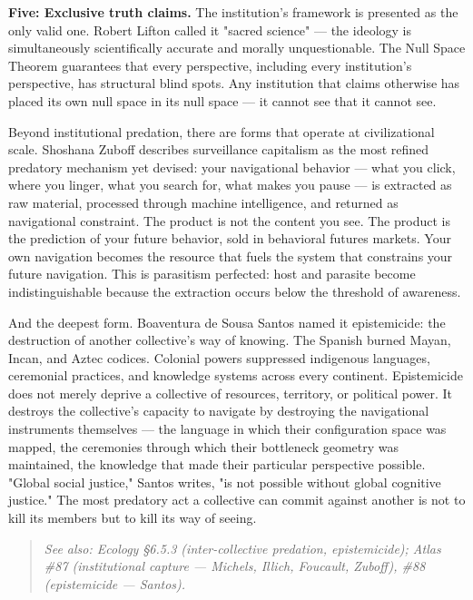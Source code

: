 \textbf{Five: Exclusive truth claims.} The institution's framework is presented as the only valid one. Robert Lifton called it "sacred science" — the ideology is simultaneously scientifically accurate and morally unquestionable. The Null Space Theorem guarantees that every perspective, including every institution's perspective, has structural blind spots. Any institution that claims otherwise has placed its own null space in its null space — it cannot see that it cannot see.


Beyond institutional predation, there are forms that operate at civilizational scale. Shoshana Zuboff describes surveillance capitalism as the most refined predatory mechanism yet devised: your navigational behavior — what you click, where you linger, what you search for, what makes you pause — is extracted as raw material, processed through machine intelligence, and returned as navigational constraint. The product is not the content you see. The product is the prediction of your future behavior, sold in behavioral futures markets. Your own navigation becomes the resource that fuels the system that constrains your future navigation. This is parasitism perfected: host and parasite become indistinguishable because the extraction occurs below the threshold of awareness.


And the deepest form. Boaventura de Sousa Santos named it epistemicide: the destruction of another collective's way of knowing. The Spanish burned Mayan, Incan, and Aztec codices. Colonial powers suppressed indigenous languages, ceremonial practices, and knowledge systems across every continent. Epistemicide does not merely deprive a collective of resources, territory, or political power. It destroys the collective's capacity to navigate by destroying the navigational instruments themselves — the language in which their configuration space was mapped, the ceremonies through which their bottleneck geometry was maintained, the knowledge that made their particular perspective possible. "Global social justice," Santos writes, "is not possible without global cognitive justice." The most predatory act a collective can commit against another is not to kill its members but to kill its way of seeing.


\begin{quote}
\itshape
\textit{See also: Ecology §6.5.3 (inter-collective predation, epistemicide); Atlas \#87 (institutional capture — Michels, Illich, Foucault, Zuboff), \#88 (epistemicide — Santos).}
\end{quote}


